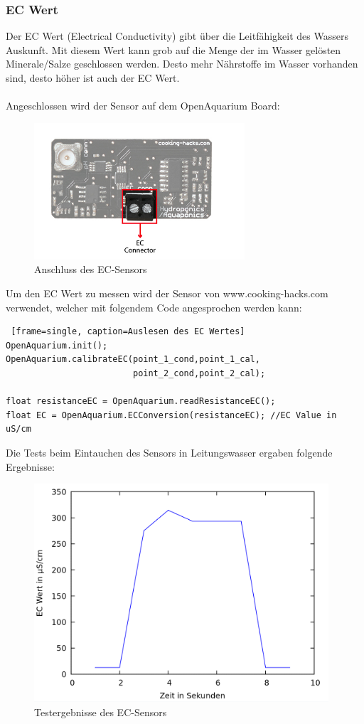 \newpage
\subsubsection{EC Wert}
Der \gls{EC} Wert (Electrical Conductivity) gibt über die Leitfähigkeit des Wassers Auskunft. Mit diesem Wert kann grob auf die Menge der im Wasser gelösten Minerale/Salze geschlossen werden. Desto mehr N\"ahrstoffe im Wasser vorhanden sind, desto h\"oher ist auch der \gls{EC} Wert. \\ \mbox{} \\
Angeschlossen wird der Sensor auf dem OpenAquarium Board: \\
\begin{figure}[ht]
    \centering
    \includegraphics[height=2.0in]{images/ec_sensor_connection}
    \caption{Anschluss des \gls{EC}-Sensors}
\end{figure}

Um den EC Wert zu messen wird der Sensor von www.cooking-hacks.com verwendet, welcher mit folgendem Code angesprochen werden kann: \cite{TempSensor}

\begin{lstlisting} [frame=single, caption=Auslesen des EC Wertes]
OpenAquarium.init();
OpenAquarium.calibrateEC(point_1_cond,point_1_cal,
                         point_2_cond,point_2_cal);

float resistanceEC = OpenAquarium.readResistanceEC();
float EC = OpenAquarium.ECConversion(resistanceEC); //EC Value in uS/cm
\end{lstlisting}
\newpage
Die Tests beim Eintauchen des Sensors in Leitungswasser ergaben folgende Ergebnisse: \\
\begin{figure}[ht]
    \centering
    \includegraphics[height=3.2in]{images/ec_tests}
    \caption{Testergebnisse des EC-Sensors}
\end{figure}

